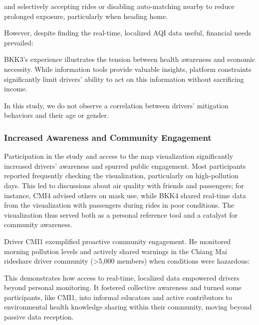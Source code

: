 and selectively accepting rides or disabling auto-matching nearby to reduce prolonged exposure, particularly when heading home.


However, despite finding the real-time, localized AQI data useful, financial needs prevailed:

\qpadding
{}
\qpadding

BKK3's experience illustrates the tension between health awareness and economic necessity.
While information tools provide valuable insights, platform constraints significantly limit drivers' ability to act on this information without sacrificing income.

In this study, we do not observe a correlation between drivers' mitigation behaviors and their age or gender.

\subsubsection{Increased Awareness and Community Engagement}
Participation in the study and access to the map visualization significantly increased drivers' awareness and spurred public engagement.
Most participants reported frequently checking the visualization, particularly on high-pollution days.
This led to discussions about air quality with friends and passengers; for instance, CMI4 advised others on mask use, while BKK4 shared real-time data from the visualization with passengers during rides in poor conditions.
The visualization thus served both as a personal reference tool and a catalyst for community awareness.

Driver CMI1 exemplified proactive community engagement.
He monitored morning pollution levels and actively shared warnings in the Chiang Mai rideshare driver community (>5,000 members) when conditions were hazardous:

\qpadding
{}
\qpadding

This demonstrates how access to real-time, localized data empowered drivers beyond personal monitoring.
It fostered collective awareness and turned some participants, like CMI1, into informal educators and active contributors to environmental health knowledge sharing within their community, moving beyond passive data reception.

